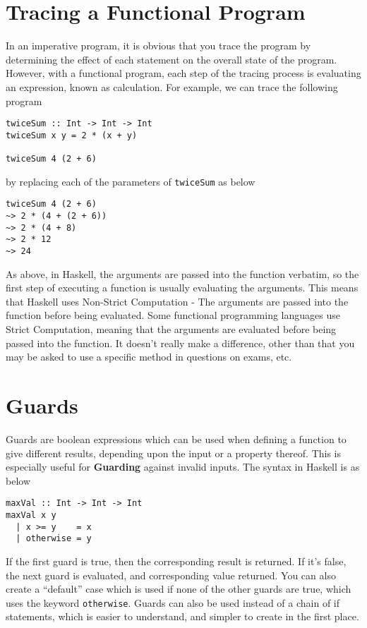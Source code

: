 
\section*{Tracing a Functional Program}

In an imperative program, it is obvious that you trace the program by determining the effect of each statement on the
 overall state of the program. However, with a functional program, each step of the tracing process is evaluating an
 expression, known as calculation. For example, we can trace the following program
\begin{verbatim}
twiceSum :: Int -> Int -> Int
twiceSum x y = 2 * (x + y)

twiceSum 4 (2 + 6)
\end{verbatim}
by replacing each of the parameters of \verb_twiceSum_ as below
\begin{verbatim}
twiceSum 4 (2 + 6)
~> 2 * (4 + (2 + 6))
~> 2 * (4 + 8)
~> 2 * 12
~> 24
\end{verbatim}

As above, in Haskell, the arguments are passed into the function verbatim, so the first step of executing a function is
 usually evaluating the arguments. This means that Haskell uses Non-Strict Computation - The arguments are passed
 into the function before being evaluated. Some functional programming languages use Strict Computation, meaning that
 the arguments are evaluated before being passed into the function. It doesn't really make a difference, other than that
 you may be asked to use a specific method in questions on exams, etc.

\section*{Guards}

Guards are boolean expressions which can be used when defining a function to give different results, depending upon the
 input or a property thereof. This is especially useful for \textbf{Guarding} against invalid inputs. The syntax in
 Haskell is as below
\begin{verbatim}
maxVal :: Int -> Int -> Int
maxVal x y
  | x >= y    = x
  | otherwise = y
\end{verbatim}
If the first guard is true, then the corresponding result is returned. If it's false, the next guard is evaluated, and
 corresponding value returned. You can also create a ``default'' case which is used if none of the other guards are
 true, which uses the keyword \verb_otherwise_. Guards can also be used instead of a chain of if statements, which is
 easier to understand, and simpler to create in the first place.

